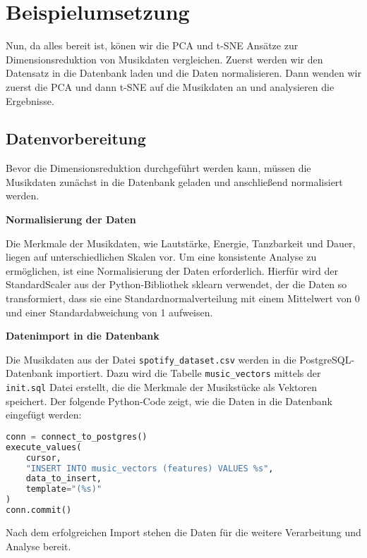 \chapter{Beispielumsetzung}

Nun, da alles bereit ist, könen wir die \ac{PCA} und \ac{t-SNE} Ansätze zur Dimensionsreduktion von Musikdaten vergleichen. Zuerst werden wir den Datensatz in die Datenbank laden und die Daten normalisieren. Dann wenden wir zuerst die PCA und dann t-SNE auf die Musikdaten an und analysieren die Ergebnisse.

\section{Datenvorbereitung}

Bevor die Dimensionsreduktion durchgeführt werden kann, müssen die Musikdaten zunächst in die Datenbank geladen und anschließend normalisiert werden.

\textbf{Normalisierung der Daten}

Die Merkmale der Musikdaten, wie Lautstärke, Energie, Tanzbarkeit und Dauer, liegen auf unterschiedlichen Skalen vor. Um eine konsistente Analyse zu ermöglichen, ist eine Normalisierung der Daten erforderlich. Hierfür wird der StandardScaler aus der Python-Bibliothek sklearn verwendet, der die Daten so transformiert, dass sie eine Standardnormalverteilung mit einem Mittelwert von 0 und einer Standardabweichung von 1 aufweisen.

\textbf{Datenimport in die Datenbank}

Die Musikdaten aus der Datei \texttt{spotify\_dataset.csv} werden in die PostgreSQL-Datenbank importiert. Dazu wird die Tabelle \texttt{music\_vectors} mittels der \texttt{init.sql} Datei erstellt, die die Merkmale der Musikstücke als Vektoren speichert. Der folgende Python-Code zeigt, wie die Daten in die Datenbank eingefügt werden:

\begin{lstlisting}[language=python, caption={Insert der Musikdaten in die Datenbank}]
conn = connect_to_postgres()
execute_values(
    cursor,
    "INSERT INTO music_vectors (features) VALUES %s",
    data_to_insert,
    template="(%s)"
)
conn.commit()
\end{lstlisting}

Nach dem erfolgreichen Import stehen die Daten für die weitere Verarbeitung und Analyse bereit.






